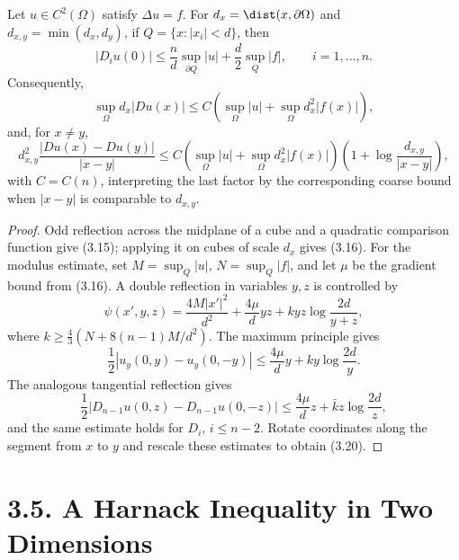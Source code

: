 \begin{theorem}\label{gt-ch3-poisson}
Let $u\in C^2(\Omega)$ satisfy $\Delta u=f$. For
$d_x=\dist(x,\partial\Omega)$ and $d_{x,y}=\min(d_x,d_y)$,
if $Q=\{x:|x_i|<d\}$, then
\begin{equation}
\tag{3.15}
|D_i u(0)|\leq\frac nd\sup_{\partial Q}|u|
+\frac d2\sup_Q|f|,\qquad i=1,\ldots,n.
\end{equation}
Consequently,
\begin{equation}
\tag{3.16}
\sup_\Omega d_x|Du(x)|\leq C
\left(\sup_\Omega|u|+\sup_\Omega d_x^2|f(x)|\right),
\end{equation}
and, for $x\neq y$,
\begin{equation}
\tag{3.20}
d_{x,y}^2\frac{|Du(x)-Du(y)|}{|x-y|}
\leq C\left(\sup_\Omega|u|+\sup_\Omega d_x^2|f(x)|\right)
\left(1+\log\frac{d_{x,y}}{|x-y|}\right),
\end{equation}
with $C=C(n)$, interpreting the last factor by the corresponding coarse
bound when $|x-y|$ is comparable to $d_{x,y}$.
\end{theorem}
\begin{proof}
\sketch Odd reflection across the midplane of a cube and a quadratic
comparison function give (3.15); applying it on cubes of scale $d_x$ gives
(3.16). For the modulus estimate, set $M=\sup_Q|u|$, $N=\sup_Q|f|$, and
let $\mu$ be the gradient bound from (3.16). A double reflection in variables
$y,z$ is controlled by
\begin{equation}
\tag{3.17}
\psi(x',y,z)=\frac{4M|x'|^2}{d^2}+\frac{4\mu}{d}yz
+kyz\log\frac{2d}{y+z},
\end{equation}
where $k\geq\frac43(N+8(n-1)M/d^2)$. The maximum principle gives
\begin{equation}
\tag{3.18}
\frac12|u_y(0,y)-u_y(0,-y)|
\leq\frac{4\mu}{d}y+ky\log\frac{2d}{y}.
\end{equation}
The analogous tangential reflection gives
\begin{equation}
\tag{3.19}
\frac12|D_{n-1}u(0,z)-D_{n-1}u(0,-z)|
\leq\frac{4\mu}{d}z+\bar k z\log\frac{2d}{z},
\end{equation}
and the same estimate holds for $D_i$, $i\leq n-2$. Rotate coordinates along
the segment from $x$ to $y$ and rescale these estimates to obtain (3.20).
\end{proof}

\section*{3.5. A Harnack Inequality in Two Dimensions}

